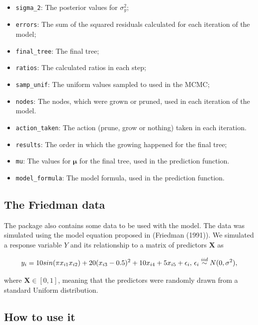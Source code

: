 \documentclass[]{article}
\providecommand{\tightlist}{%
  \setlength{\itemsep}{0pt}\setlength{\parskip}{0pt}}
\begin{document}
\begin{itemize}
\tightlist
\item
  \texttt{sigma\_2}: The posterior values for \(\sigma^2_{y}\);
\item
  \texttt{errors}: The sum of the squared residuals calculated for each
  iteration of the model;
\item
  \texttt{final\_tree}: The final tree;
\item
  \texttt{ratios}: The calculated ratios in each step;
\item
  \texttt{samp\_unif}: The uniform values sampled to used in the MCMC;
\item
  \texttt{nodes}: The nodes, which were grown or pruned, used in each
  iteration of the model.
\item
  \texttt{action\_taken}: The action (prune, grow or nothing) taken in
  each iteration.
\item
  \texttt{results}: The order in which the growing happened for the
  final tree;
\item
  \texttt{mu}: The values for \(\mathbf{\mu}\) for the final tree, used
  in the prediction function.
\item
  \texttt{model\_formula}: The model formula, used in the prediction
  function.
\end{itemize}

\hypertarget{the-friedman-data}{%
\subsection{The Friedman data}\label{the-friedman-data}}

The package also contains some data to be used with the model. The data
was simulated using the model equation proposed in (Friedman (1991)). We
simulated a response variable \(Y\) and its relationship to a matrix of
predictors \(\mathbf{X}\) as

\begin{equation}
y_i = 10 sin(\pi x_{i1} x_{i2}) + 20 (x_{i3} -
0.5)^{2} + 10 x_{i4} + 5 x_{i5} +
 \epsilon_i, \thinspace
\epsilon_i \stackrel{iid}\sim N(0, \sigma^2),
\end{equation}

where \(\mathbf{X} \in [0, 1]\), meaning that the predictors were
randomly drawn from a standard Uniform distribution.

\hypertarget{how-to-use-it}{%
\subsection{How to use it}\label{how-to-use-it}}
\end{document}
